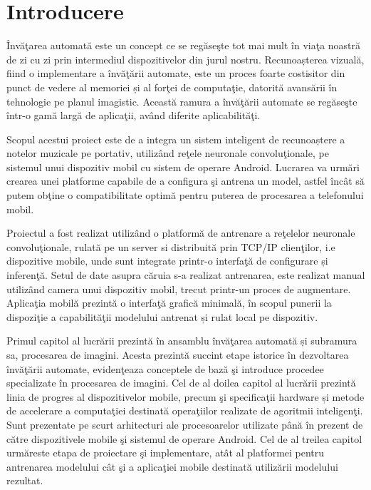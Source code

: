\chapter{Introducere}

Învăţarea automată este un concept ce se regăseşte tot mai mult în viaţa noastră de zi cu zi prin intermediul dispozitivelor din jurul nostru. Recunoașterea vizuală, fiind o implementare a învăţării automate, este un proces foarte costisitor din punct de vedere al memoriei și al forţei de computaţie, datorită avansării în tehnologie pe planul imagistic. Această ramura a învăţării automate se regăseşte într-o gamă largă de aplicaţii, având diferite aplicabilităţi.  \newline

Scopul acestui proiect este de a integra un sistem inteligent de recunoaștere a notelor muzicale pe portativ, utilizând reţele neuronale convoluţionale, pe sistemul unui dispozitiv mobil cu sistem de operare Android. Lucrarea va urmări crearea unei platforme capabile de a configura şi antrena un model, astfel încât să putem obţine o compatibilitate optimă pentru puterea de procesarea a telefonului mobil.\newline

Proiectul a fost realizat utilizând o platformă de antrenare a reţelelor neuronale convoluţionale, rulată pe un server si distribuită prin TCP/IP clienţilor, i.e dispozitive mobile, unde sunt integrate printr-o interfaţă de configurare și inferenţă. Setul de date asupra căruia s-a realizat antrenarea, este realizat manual utilizând camera unui dispozitiv mobil, trecut printr-un proces de augmentare. 
Aplicaţia mobilă prezintă o interfaţă grafică minimală, în scopul punerii la dispoziţie a capabilităţii modelului antrenat și rulat local pe dispozitiv.\newline

Primul capitol al lucrării prezintă în ansamblu învăţarea automată și subramura sa, procesarea de imagini. Acesta prezintă succint etape istorice în dezvoltarea învăţării automate, evidenţeaza conceptele de bază şi introduce procedee specializate în procesarea de imagini.
Cel de al doilea capitol al lucrării prezintă linia de progres al dispozitivelor mobile, precum şi specificaţii hardware și metode de accelerare a computaţiei destinată operaţiilor realizate de agoritmii inteligenţi. Sunt prezentate pe scurt arhitecturi ale procesoarelor utilizate până în prezent de către dispozitivele mobile şi sistemul de operare Android.
Cel de al treilea capitol urmăreste etapa de proiectare şi implementare, atât al platformei pentru antrenarea modelului cât şi a aplicaţiei mobile destinată utilizării modelului rezultat.